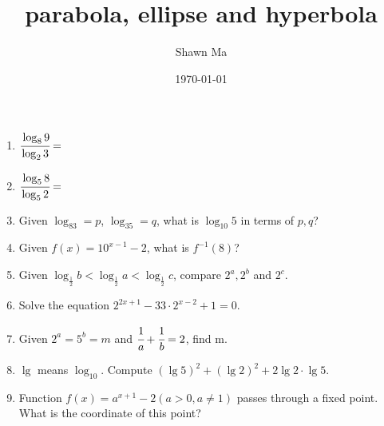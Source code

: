 \documentclass[letterpaper,12pt]{article}
\author{Shawn Ma}
\date{\today}
\title{parabola, ellipse and hyperbola}
\begin{document}
\setlength{\parindent}{0pt}

\begin{enumerate}
\item $\cfrac{\log_89}{\log_23}=$

\item $\cfrac{\log_58}{\log_52}=$

\item Given $\log_83=p$, $\log_35=q$, what is $\log_{10}5$ in terms of $p, q$?

\item Given $f(x)=10^{x-1}-2$, what is $f^{-1}(8)$?

\item Given $\log_{\frac{1}{2}}b<\log_{\frac{1}{2}}a<\log_{\frac{1}{2}}c$,
compare $2^a, 2^b$ and $2^c$.

\item Solve the equation $2^{2x+1}-33\cdot 2^{x-2}+1=0$.
\item Given $2^a=5^b=m$ and $\cfrac{1}{a}+\cfrac{1}{b}=2$, find m.
\item $\lg$ means $\log_{10}$. Compute $(\lg5)^2+(\lg2)^2+2\lg2\cdot\lg5$.
\item Function $f(x)=a^{x+1}-2(a>0, a\neq1)$ passes through a fixed point. What is the coordinate of this point?
\end{enumerate}
\end{document}
